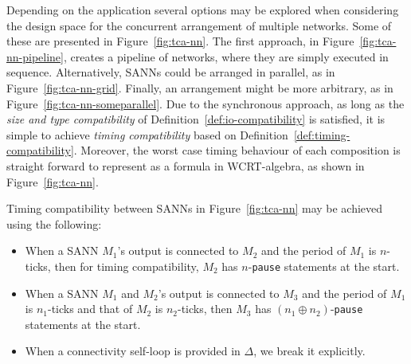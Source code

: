 Depending on the application several options may be explored when
considering the design space for the concurrent arrangement of
multiple networks. Some of these are presented in Figure~\ref{fig:tca-nn}.
The first approach, in Figure~\ref{fig:tca-nn-pipeline}, creates a pipeline of networks, where they are simply executed in sequence.
Alternatively, \acp{SANN} could be arranged in parallel, as in Figure~\ref{fig:tca-nn-grid}. 
Finally, an arrangement might be more arbitrary, as in Figure~\ref{fig:tca-nn-someparallel}. 
Due to the synchronous approach, as long as the \emph{size and type
	compatibility} of Definition~\ref{def:io-compatibility} is
satisfied, it is simple to achieve \emph{timing compatibility} based on Definition~\ref{def:timing-compatibility}. 
Moreover, the worst case timing behaviour of each composition is
straight forward to represent as a formula in \ac{WCRT}-algebra, as
shown in Figure~\ref{fig:tca-nn}.

\begin{definition}
	\label{def:timing-compatibility}
	Timing compatibility between \acp{SANN} in Figure~\ref{fig:tca-nn} may
	be achieved using the following:
	\begin{itemize}
		\item When a \ac{SANN} $M_1$'s output is connected to $M_2$ and the
		period of $M_1$ is $n$-ticks, then for timing compatibility, $M_2$
		has $n$-\texttt{pause} statements at the start.
		\item When a \ac{SANN} $M_1$ and $M_2$'s output is connected to $M_3$ and the
		period of $M_1$ is $n_1$-ticks and that of $M_2$ is $n_2$-ticks,
		then $M_3$ has $(n_1 \oplus n_2)$-\texttt{pause} statements at the start.
		\item When a connectivity self-loop is provided in $\Delta$, we break it explicitly.
	\end{itemize}
\end{definition}



